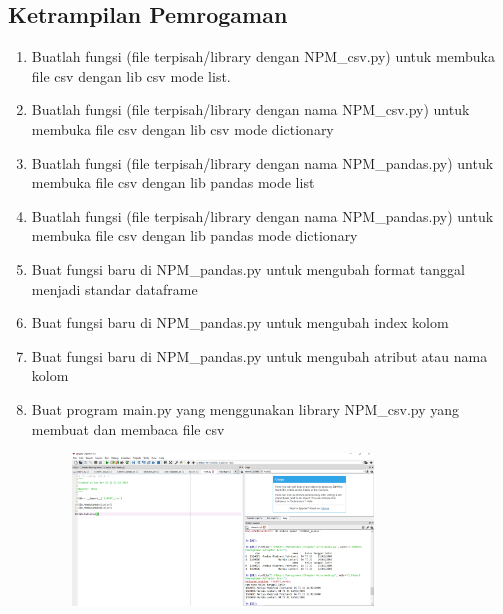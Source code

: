 \documentclass[a4paper, 12pt]{article}
\begin{document}
\begin{enumerate}
\section{Ketrampilan Pemrogaman}
\begin{enumerate}
\item Buatlah fungsi (file terpisah/library dengan NPM\_csv.py) untuk membuka file csv dengan lib csv mode list.

\item Buatlah fungsi (file terpisah/library dengan nama NPM\_csv.py) untuk membuka file csv dengan lib csv mode dictionary

\item Buatlah fungsi (file terpisah/library dengan nama NPM\_pandas.py) untuk membuka file csv dengan lib pandas mode list

\item Buatlah fungsi (file terpisah/library dengan nama NPM\_pandas.py) untuk membuka file csv dengan lib pandas mode dictionary

\item Buat fungsi baru di NPM\_pandas.py untuk mengubah format tanggal menjadi standar dataframe

\item Buat fungsi baru di NPM\_pandas.py untuk mengubah index kolom

\item Buat fungsi baru di NPM\_pandas.py untuk mengubah atribut atau nama kolom

\item Buat program main.py yang menggunakan library NPM\_csv.py yang membuat dan membaca file csv

\begin{figure}[H]
			\includegraphics[width=8cm]{figures/kp1.png}

\end{figure}
\end{enumerate}
\end{enumerate}
\end{document}

